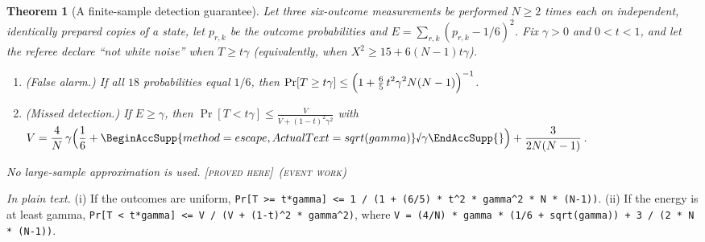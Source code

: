 \documentclass[11pt]{article}
\newcommand{\rsym}[2]{\BeginAccSupp{method=escape,ActualText=sqrt(#2)}\text{\textsurd}#1\EndAccSupp{}}
\newcommand{\E}{E}                       %
\newcommand{\st}[1]{\textsc{[#1]}}
\newcommand{\stproved}{\st{proved here}}
\newcommand{\event}{\textsc{(event work)}}
\newtheorem{theorem}{Theorem}
\theoremstyle{definition}
\theoremstyle{remark}
\begin{document}
\begin{theorem}[A finite-sample detection guarantee]\label{thm:finite}
Let three six-outcome measurements be performed $N\ge2$ times each on independent, identically prepared copies of
a state, let $p_{r,k}$ be the outcome probabilities and $\E=\sum_{r,k}(p_{r,k}-1/6)^2$. Fix $\gamma>0$ and
$0<t<1$, and let the referee declare ``not white noise'' when $T\ge t\gamma$ (equivalently, when
$X^2\ge15+6(N-1)t\gamma$).
\begin{enumerate}[label=(\roman*)]
\item (\emph{False alarm.}) If all $18$ probabilities equal $1/6$, then
      $\displaystyle\Pr[T\ge t\gamma]\le\Bigl(1+\tfrac{6}{5}\,t^2\gamma^2N(N-1)\Bigr)^{-1}$.
\item (\emph{Missed detection.}) If $\E\ge\gamma$, then
      $\displaystyle\Pr[T<t\gamma]\le\frac{V}{V+(1-t)^2\gamma^2}$ with
      $\displaystyle V=\frac4N\,\gamma\Bigl(\frac16+\rsym{\gamma}{gamma}\Bigr)+\frac{3}{2N(N-1)}$.
\end{enumerate}
No large-sample approximation is used. \stproved\ \event
\end{theorem}

{\raggedright \noindent\emph{In plain text.} (i) If the outcomes are uniform, \texttt{Pr[T >= t*gamma] <= 1 / (1 + (6/5) * t\textasciicircum{}2 *
gamma\textasciicircum{}2 * N * (N-1))}. (ii) If the energy is at least gamma, \texttt{Pr[T < t*gamma] <= V / (V + (1-t)\textasciicircum{}2 *
gamma\textasciicircum{}2)}, where \texttt{V = (4/N) * gamma * (1/6 + sqrt(gamma)) + 3 / (2 * N * (N-1))}.\par}
\end{document}
